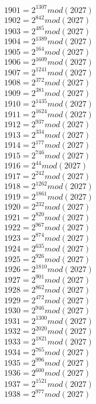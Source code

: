 \documentclass[12pt, letterpaper]{article}
\begin{document}
\begin{itemize}
\begin{multicols}{3}
$1901= 2^{1307} mod (2027)$\\
$1902= 2^{842} mod (2027)$\\
$1903= 2^{485} mod (2027)$\\
$1904= 2^{1389} mod (2027)$\\
$1905= 2^{164} mod (2027)$\\
$1906= 2^{1609} mod (2027)$\\
$1907= 2^{1241} mod (2027)$\\
$1908= 2^{372} mod (2027)$\\
$1909= 2^{381} mod (2027)$\\
$1910= 2^{1435} mod (2027)$\\
$1911= 2^{1624} mod (2027)$\\
$1912= 2^{937} mod (2027)$\\
$1913= 2^{334} mod (2027)$\\
$1914= 2^{177} mod (2027)$\\
$1915= 2^{746} mod (2027)$\\
$1916= 2^{44} mod (2027)$\\
$1917= 2^{242} mod (2027)$\\
$1918= 2^{1262} mod (2027)$\\
$1919= 2^{1861} mod (2027)$\\
$1920= 2^{232} mod (2027)$\\
$1921= 2^{820} mod (2027)$\\
$1922= 2^{967} mod (2027)$\\
$1923= 2^{874} mod (2027)$\\
$1924= 2^{635} mod (2027)$\\
$1925= 2^{926} mod (2027)$\\
$1926= 2^{1810} mod (2027)$\\
$1927= 2^{901} mod (2027)$\\
$1928= 2^{862} mod (2027)$\\
$1929= 2^{472} mod (2027)$\\
$1930= 2^{946} mod (2027)$\\
$1931= 2^{1300} mod (2027)$\\
$1932= 2^{2020} mod (2027)$\\
$1933= 2^{1821} mod (2027)$\\
$1934= 2^{765} mod (2027)$\\
$1935= 2^{996} mod (2027)$\\
$1936= 2^{600} mod (2027)$\\
$1937= 2^{1521} mod (2027)$\\
$1938= 2^{977} mod (2027)$\\

\end{multicols}
\end{itemize}
\end{document}
